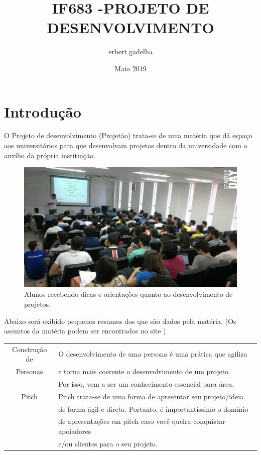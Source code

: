 \documentclass{article}
\title{IF683 -PROJETO DE DESENVOLVIMENTO}
\author{erbert.gadelha }
\date{Maio 2019}
\begin{document}
\maketitle

\section{Introdução}
	O Projeto de desenvolvimento (Projetão) trata-se de uma matéria que dá espaço aos universitários para que desenvolvam projetos dentro da universidade com o auxílio da própria instituição.

\begin{figure}[h!]
    \centering
    \includegraphics[scale=0.3]{imagem_01.jpg}
    \caption{Alunos recebendo dicas e orientações quanto ao desenvolvimento de projetos.}
    \label{fig:imagem_01.jpg}
\end{figure}

Abaixo será exibido pequenos resumos dos que são dados pela matéria. (Os assuntos da matéria podem ser encontrados no site \cite{ref_aulas}) 

\begin{table}[h]
    \centering
    \begin{tabular}{c|l}
        \hline
        Construção de&O desenvolvimento de uma persona é uma prática que agiliza\\Personas&e torna mais coerente o desenvolvimento de um projeto.\\&Por isso, vem a ser um conhecimento essencial para área.\\
        \hline
        Pitch&Pitch trata-se de uma forma de apresentar seu projeto/ideia\\&de forma ágil e direta. Portanto, é importantíssimo o domínio\\&de apresentações em pitch caso você queira conquistar apoiadores\\&e/ou clientes para o seu projeto.\\
        \hline
    \end{tabular}
    \label{tab:my_label}
\end{table}
\end{document}
